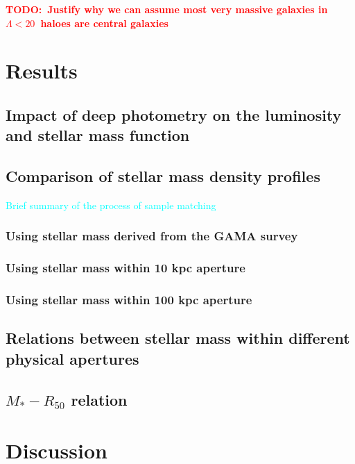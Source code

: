 \documentclass[preprint]{aastex}
\def\nonbcg{{$\Lambda < 20$}}
\newcommand{\todo}[1]{\textcolor{red}{\textbf{TODO:~#1}}}
\newcommand{\plan}[1]{\textcolor{cyan}{#1}}
\begin{document}
\begin{CJK*}{UTF8}{gbsn}
    \todo{Justify why we can assume most very massive galaxies in \nonbcg~haloes are
        central galaxies}


\section{Results}

\subsection{Impact of deep photometry on the luminosity and stellar mass function}

\subsection{Comparison of stellar mass density profiles}

    \plan{Brief summary of the process of sample matching}

\subsubsection{Using stellar mass derived from the GAMA survey}

\subsubsection{Using stellar mass within 10 kpc aperture}

\subsubsection{Using stellar mass within 100 kpc aperture}

\subsection{Relations between stellar mass within different physical apertures}

\subsection{$M_{\ast}-R_{\mathrm{50}}$ relation}


\section{Discussion}


\end{CJK*}
\end{document}
